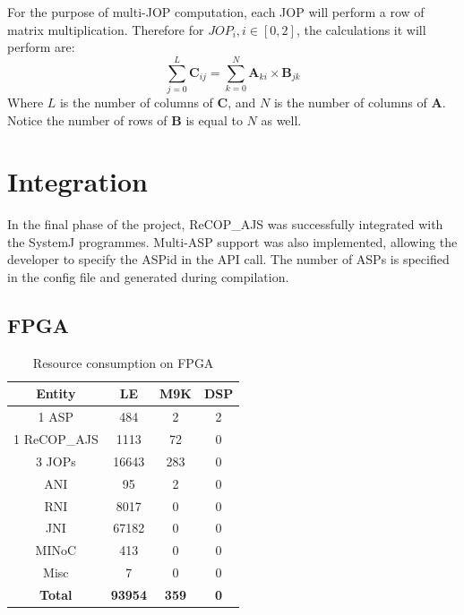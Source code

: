 \documentclass[]{article}
\begin{document}
	For the purpose of multi-JOP computation, each JOP will perform a row of matrix multiplication. Therefore for $JOP_i, i \in [0,2]$, the calculations it will perform are:
	\begin{equation}
	\sum\limits_{j=0}^{L}\textbf{C}_{ij} = \sum\limits_{k=0}^{N} \textbf{A}_{ki} \times \textbf{B}_{jk}
	\end{equation}
	Where $L$ is the number of columns of $\textbf{C}$, and $N$ is the number of columns of $\textbf{A}$. Notice the number of rows of $\textbf{B}$ is equal to $N$ as well.
	
	
	\section{Integration}
	In the final phase of the project, ReCOP\_AJS was successfully integrated with the SystemJ programmes. Multi-ASP support was also implemented, allowing the developer to specify the ASPid in the API call. The number of ASPs is specified in the config file and generated during compilation.
	\subsection{FPGA}
	\begin{table}[H]
		\centering
		\begin{tabular}{|c|c|c|c|}
			\hline
			\textbf{Entity} & \textbf{LE}    & \textbf{M9K} & \textbf{DSP} \\ \hline\hline
			1 ASP           & 484            & 2            & 2            \\ \hline
			1 ReCOP\_AJS    & 1113           & 72           & 0            \\ \hline
			3 JOPs          & 16643          & 283          & 0            \\ \hline
			ANI             & 95             & 2            & 0            \\ \hline
			RNI             & 8017           & 0            & 0            \\ \hline
			JNI             & 67182          & 0            & 0            \\ \hline
			MINoC           & 413            & 0            & 0            \\ \hline
			Misc            & 7              & 0            & 0            \\ \hline\hline
			\textbf{Total}  & \textbf{93954} & \textbf{359} & \textbf{0}   \\ \hline
		\end{tabular}
		\caption{Resource consumption on FPGA}
		\label{table:resource}
	\end{table}
	
\end{document}
